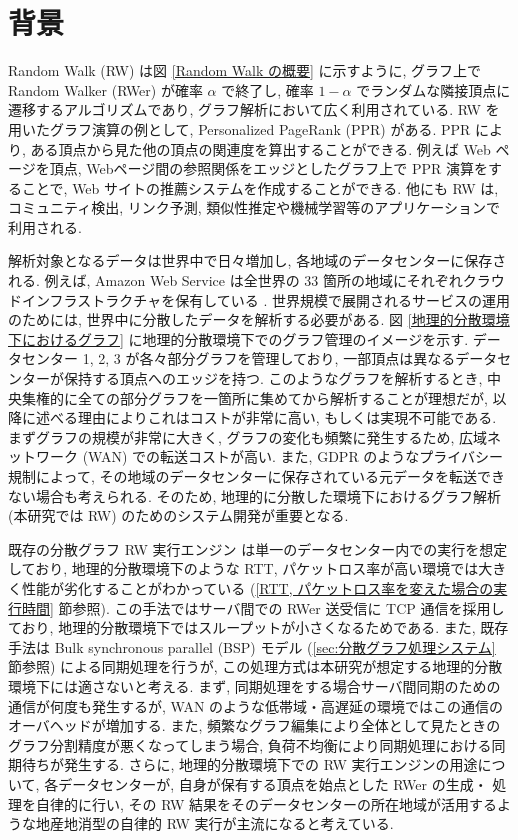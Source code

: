 \section{背景}

Random Walk (RW) は図 \ref{Random Walk の概要} に示すように, グラフ上で Random Walker (RWer) が確率 $\alpha$ で終了し, 確率 $1 - \alpha$ でランダムな隣接頂点に遷移するアルゴリズムであり, グラフ解析において広く利用されている. RW を用いたグラフ演算の例として, Personalized PageRank \cite{PPR} (PPR) がある. PPR により, ある頂点から見た他の頂点の関連度を算出することができる. 例えば Web ページを頂点, Webページ間の参照関係をエッジとしたグラフ上で PPR 演算をすることで, Web サイトの推薦システムを作成することができる. 他にも RW は, コミュニティ検出, リンク予測, 類似性推定や機械学習等のアプリケーションで利用される. 

解析対象となるデータは世界中で日々増加し, 各地域のデータセンターに保存される. 例えば, Amazon Web Service は全世界の 33 箇所の地域にそれぞれクラウドインフラストラクチャを保有している \cite{aws} . 世界規模で展開されるサービスの運用のためには, 世界中に分散したデータを解析する必要がある. 図 \ref{地理的分散環境下におけるグラフ} に地理的分散環境下でのグラフ管理のイメージを示す. データセンター 1, 2, 3 が各々部分グラフを管理しており, 一部頂点は異なるデータセンターが保持する頂点へのエッジを持つ. このようなグラフを解析するとき, 中央集権的に全ての部分グラフを一箇所に集めてから解析することが理想だが, 以降に述べる理由によりこれはコストが非常に高い, もしくは実現不可能である. まずグラフの規模が非常に大きく, グラフの変化も頻繁に発生するため, 広域ネットワーク (WAN) での転送コストが高い. また, GDPR のようなプライバシー規制によって, その地域のデータセンターに保存されている元データを転送できない場合も考えられる. そのため, 地理的に分散した環境下におけるグラフ解析 (本研究では RW) のためのシステム開発が重要となる. 

既存の分散グラフ RW 実行エンジン \cite{10.1145/3341301.3359634} は単一のデータセンター内での実行を想定しており, 地理的分散環境下のような RTT, パケットロス率が高い環境では大きく性能が劣化することがわかっている (\ref{RTT, パケットロス率を変えた場合の実行時間} 節参照). この手法ではサーバ間での RWer 送受信に TCP 通信を採用しており, 地理的分散環境下ではスループットが小さくなるためである. また, 既存手法は Bulk synchronous parallel (BSP) モデル (\ref{sec:分散グラフ処理システム} 節参照) による同期処理を行うが, この処理方式は本研究が想定する地理的分散環境下には適さないと考える. まず, 同期処理をする場合サーバ間同期のための通信が何度も発生するが, WAN のような低帯域・高遅延の環境ではこの通信のオーバヘッドが増加する. また, 頻繁なグラフ編集により全体として見たときのグラフ分割精度が悪くなってしまう場合, 負荷不均衡により同期処理における同期待ちが発生する. さらに, 地理的分散環境下での RW 実行エンジンの用途について, 各データセンターが, 自身が保有する頂点を始点とした RWer の生成・ 処理を自律的に行い, その RW 結果をそのデータセンターの所在地域が活用するような地産地消型の自律的 RW 実行が主流になると考えている. 

